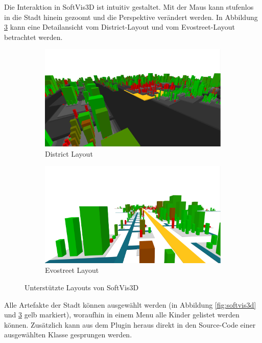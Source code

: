 Die Interaktion in SoftVis3D ist intuitiv gestaltet. Mit der Maus kann stufenlos in die Stadt hinein gezoomt und die Perspektive verändert werden. In Abbildung \ref{fig:softvis3d-layouts} kann eine Detailansicht vom District-Layout und vom Evostreet-Layout betrachtet werden.

\setlength{\fwidth}{.49\textwidth}
\begin{figure}[htbp]
	\centering
	\begin{subfigure}[b]{\fwidth}
		\centering
		\includegraphics[width=\linewidth]{figures/softvis3d-district}
		\caption{District Layout} \label{fig:softvis3d-district}
	\end{subfigure}
	\hfill
	\begin{subfigure}[b]{\fwidth}
		\centering
		\includegraphics[width=\linewidth]{figures/softvis3d-evostreet}
		\caption{Evostreet Layout} \label{fig:softvis3d-evostreet}
	\end{subfigure}
	\caption{Unterstützte Layouts von SoftVis3D} \label{fig:softvis3d-layouts}
\end{figure}

Alle Artefakte der Stadt können ausgewählt werden (in Abbildung \ref{fig:softvis3d} und \ref{fig:softvis3d-layouts} gelb markiert), woraufhin in einem Menu alle Kinder gelistet werden können. Zusätzlich kann aus dem Plugin heraus direkt in den Source-Code einer ausgewählten Klasse gesprungen werden.

